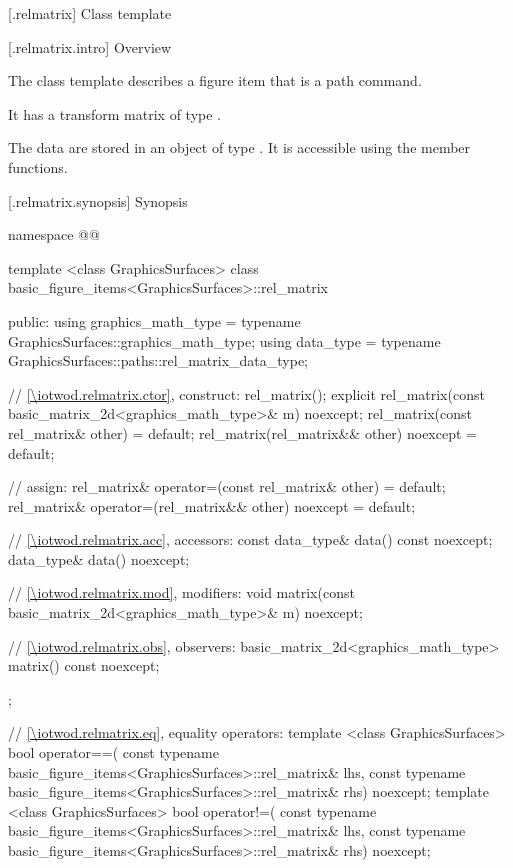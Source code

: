 [\iotwod.relmatrix] {Class template }

 [\iotwod.relmatrix.intro] {Overview}

\pnum
{}%
The class template  describes a figure item that is a path command.

\pnum
It has a transform matrix of type .

\pnum
The data are stored in an object of type . It is accessible using the  member functions.

 [\iotwod.relmatrix.synopsis] {Synopsis}
\begin{codeblock}
namespace @\fullnamespace{}@ {
  template <class GraphicsSurfaces>
  class basic_figure_items<GraphicsSurfaces>::rel_matrix {
  public:
    using graphics_math_type = typename GraphicsSurfaces::graphics_math_type;
    using data_type =
      typename GraphicsSurfaces::paths::rel_matrix_data_type;

    // \ref{\iotwod.relmatrix.ctor}, construct:
    rel_matrix();
    explicit rel_matrix(const basic_matrix_2d<graphics_math_type>& m) noexcept;
    rel_matrix(const rel_matrix& other) = default;
    rel_matrix(rel_matrix&& other) noexcept = default;

    // assign:
    rel_matrix& operator=(const rel_matrix& other) = default;
    rel_matrix& operator=(rel_matrix&& other) noexcept = default;

    // \ref{\iotwod.relmatrix.acc}, accessors:
    const data_type& data() const noexcept;
    data_type& data() noexcept;

    // \ref{\iotwod.relmatrix.mod}, modifiers:
    void matrix(const basic_matrix_2d<graphics_math_type>& m) noexcept;

    // \ref{\iotwod.relmatrix.obs}, observers:
    basic_matrix_2d<graphics_math_type> matrix() const noexcept;
  };
  
  // \ref{\iotwod.relmatrix.eq}, equality operators:
  template <class GraphicsSurfaces>
  bool operator==(
    const typename basic_figure_items<GraphicsSurfaces>::rel_matrix& lhs,
    const typename basic_figure_items<GraphicsSurfaces>::rel_matrix& rhs) 
    noexcept;  
  template <class GraphicsSurfaces>
  bool operator!=(
    const typename basic_figure_items<GraphicsSurfaces>::rel_matrix& lhs,
    const typename basic_figure_items<GraphicsSurfaces>::rel_matrix& rhs) 
    noexcept;  
}
\end{codeblock}

